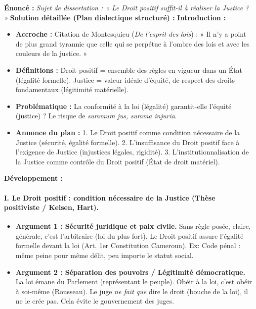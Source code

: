 \documentclass[11pt]{article}
\newcommand{\cle}[1]{{\popxbold\color{popdark}#1}}
\begin{document}
\begin{exoresolu}
    \textbf{Énoncé :} \textit{Sujet de dissertation : « Le Droit positif suffit-il à réaliser la Justice ? »}
    \tcblower
    \textbf{Solution détaillée (Plan dialectique structuré) :}
    \textbf{Introduction :}
    \begin{itemize}
        \item \textbf{Accroche :} Citation de Montesquieu (\emph{De l'esprit des lois}) : « Il n'y a point de plus grand tyrannie que celle qui se perpétue à l'ombre des lois et avec les couleurs de la justice. »
        \item \textbf{Définitions :} Droit positif = ensemble des règles en vigueur dans un État (légalité formelle). Justice = valeur idéale d'équité, de respect des droits fondamentaux (légitimité matérielle).
        \item \textbf{Problématique :} La conformité à la loi (légalité) garantit-elle l'équité (justice) ? Le risque de \emph{summum jus, summa injuria}.
        \item \textbf{Annonce du plan :} 1. Le Droit positif comme condition nécessaire de la Justice (sécurité, égalité formelle). 2. L'insuffisance du Droit positif face à l'exigence de Justice (injustices légales, rigidité). 3. L'institutionnalisation de la Justice comme contrôle du Droit positif (État de droit matériel).
    \end{itemize}
    \textbf{Développement :}
    \paragraph{I. Le Droit positif : condition nécessaire de la Justice (Thèse positiviste / Kelsen, Hart).}
    \begin{itemize}
        \item \textbf{Argument 1 : Sécurité juridique et paix civile.} Sans règle posée, claire, générale, c'est l'arbitraire (loi du plus fort). Le Droit positif assure l'\cle{égalité formelle} devant la loi (Art. 1er Constitution Cameroun). Ex: Code pénal : même peine pour même délit, peu importe le statut social.
        \item \textbf{Argument 2 : Séparation des pouvoirs / Légitimité démocratique.} La loi émane du Parlement (représentant le peuple). Obéir à la loi, c'est obéir à soi-même (Rousseau). Le juge \emph{ne fait que} dire le droit (bouche de la loi), il ne le crée pas. Cela évite le gouvernement des juges.
    \end{itemize}

\end{exoresolu}
\end{document}
